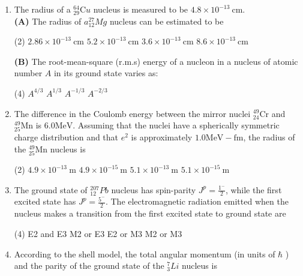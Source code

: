 \begin{enumerate}
	\item  The radius of a ${ }_{29}^{64} \mathrm{C} u$ nucleus is measured to be $4.8 \times 10^{-13} \mathrm{~cm}$.\\
	\textbf{(A)} The radius of $a{ }_{12}^{27} M g$ nucleus can be estimated to be
	{	}
	\begin{tasks}(2)
		\task[\textbf{A.}] $2.86 \times 10^{-13} \mathrm{~cm}$
		\task[\textbf{B.}] $5.2 \times 10^{-13} \mathrm{~cm}$
		\task[\textbf{C.}] $3.6 \times 10^{-13} \mathrm{~cm}$
		\task[\textbf{D.}] $8.6 \times 10^{-13} \mathrm{~cm}$
	\end{tasks}
	\textbf{(B)} The root-mean-square (r.m.s) energy of a nucleon in a nucleus of atomic number $A$ in its ground state varies as:
	\begin{tasks}(4)
		\task[\textbf{A.}] $A^{4 / 3}$
		\task[\textbf{B.}] $A^{1 / 3}$
		\task[\textbf{C.}] $A^{-1 / 3}$
		\task[\textbf{D.}] $A^{-2 / 3}$
	\end{tasks}
	\item The difference in the Coulomb energy between the mirror nuclei ${ }_{24}^{49} \mathrm{Cr}$ and ${ }_{25}^{49} \mathrm{Mn}$ is $6.0 \mathrm{MeV}$. Assuming that the nuclei have a spherically symmetric charge distribution and that $e^{2}$ is approximately $1.0 \mathrm{MeV}-\mathrm{fm}$, the radius of the ${ }_{25}^{49} \mathrm{Mn}$ nucleus is
	{}
	\begin{tasks}(2)
		\task[\textbf{A.}] $4.9 \times 10^{-13} \mathrm{~m}$
		\task[\textbf{B.}] $4.9 \times 10^{-15} \mathrm{~m}$
		\task[\textbf{C.}] $5.1 \times 10^{-13} \mathrm{~m}$
		\task[\textbf{D.}] $5.1 \times 10^{-15} \mathrm{~m}$
	\end{tasks}
	\item The ground state of ${ }_{12}^{207} P b$ nucleus has spin-parity $J^{p}=\frac{1^{-}}{2}$, while the first excited state has $J^{p}=\frac{5^{-}}{2}$. The electromagnetic radiation emitted when the nucleus makes a transition from the first excited state to ground state are
	{}
	\begin{tasks}(4)
		\task[\textbf{A.}] E2 and E3
		\task[\textbf{B.}] M2 or E3
		\task[\textbf{C.}] E2 or M3
		\task[\textbf{D.}] M2 or M3
	\end{tasks}	
	\item According to the shell model, the total angular momentum (in units of $\hbar$ ) and the parity
	of the ground state of the $ {^7_3}Li$ nucleus is

\end{enumerate}
